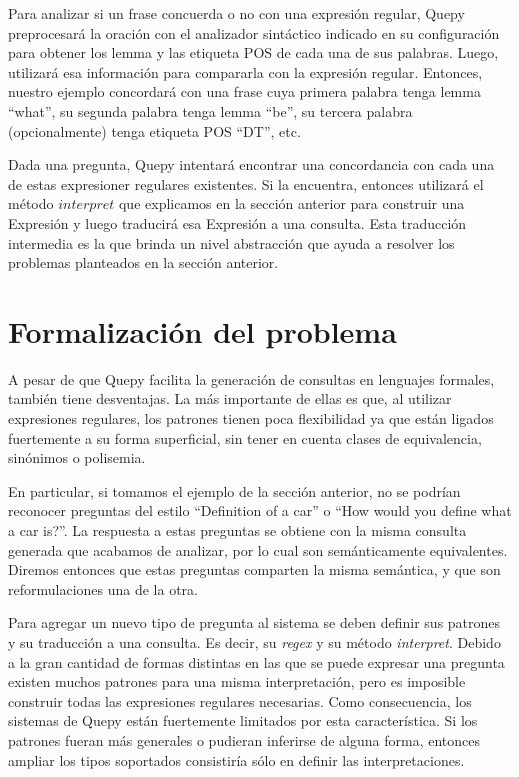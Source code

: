 Para analizar si un frase concuerda o no con una expresión regular, Quepy preprocesará la oración con el analizador sintáctico indicado en su configuración para obtener los lemma y las etiqueta POS de cada una de sus palabras. Luego, utilizará esa información para compararla con la expresión regular. Entonces, nuestro ejemplo concordará con una frase cuya primera palabra tenga lemma ``what'', su segunda palabra tenga lemma ``be'', su tercera palabra (opcionalmente) tenga etiqueta POS ``DT'', etc.

Dada una pregunta, Quepy intentará encontrar una concordancia con cada una de estas expresioner regulares existentes. Si la encuentra, entonces utilizará el método $interpret$ que explicamos en la sección anterior para construir una Expresión y luego traducirá esa Expresión a una consulta. Esta traducción intermedia es la que brinda un nivel abstracción que ayuda a resolver los problemas planteados en la sección anterior.

\chapter{Formalización del problema}

A pesar de que Quepy facilita la generación de consultas en lenguajes formales, también tiene desventajas. La más importante de ellas es que, al utilizar expresiones regulares, los patrones tienen poca flexibilidad ya que están ligados fuertemente a su forma superficial, sin tener en cuenta clases de equivalencia, sinónimos o polisemia.

En particular, si tomamos el ejemplo de la sección anterior, no se podrían reconocer preguntas del estilo ``Definition of a car'' o ``How would you define what a car is?''. La respuesta a estas preguntas se obtiene con la misma consulta generada que acabamos de analizar, por lo cual son semánticamente equivalentes. Diremos entonces que estas preguntas comparten la misma semántica, y que son reformulaciones una de la otra.

Para agregar un nuevo tipo de pregunta al sistema se deben definir sus patrones y su traducción a una consulta. Es decir, su \textit{regex} y su método \textit{interpret}. Debido a la gran cantidad de formas distintas en las que se puede expresar una pregunta existen muchos patrones para una misma interpretación, pero es imposible construir todas las expresiones regulares necesarias. Como consecuencia, los sistemas de Quepy están fuertemente limitados por esta característica. Si los patrones fueran más generales o pudieran inferirse de alguna forma, entonces ampliar los tipos soportados consistiría sólo en definir las interpretaciones.

